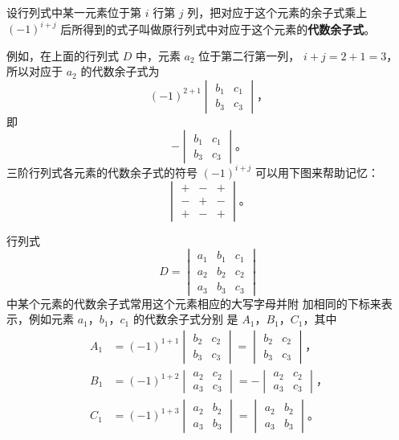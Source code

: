 设行列式中某一元素位于第 $i$ 行第 $j$ 列，把对应于这个元素的余子式乘上
 $(-1)^{i+j}$ 后所得到的式子叫做原行列式中对应于这个元素的\textbf{代数余子式}。

例如，在上面的行列式 $D$ 中，元素 $a_2$ 位于第二行第一列，
$i + j = 2 + 1 = 3$， 所以对应于 $a_2$ 的代数余子式为
$$
(-1)^{2+1}\begin{vmatrix}
    b_1 & c_1 \\
    b_3 & c_3
\end{vmatrix} \text{，}
$$
即
$$
-\begin{vmatrix}
    b_1 & c_1 \\
    b_3 & c_3
\end{vmatrix} \text{。}
$$
三阶行列式各元素的代数余子式的符号 $(-1)^{i+j}$ 可以用下图来帮助记忆：
$$
\begin{vmatrix}
	+ & - & + \\
	- & + & - \\
	+ & - & +
\end{vmatrix} \text{。}
$$

行列式
$$
D = \begin{vmatrix*}
    a_1 & b_1 & c_1 \\
    a_2 & b_2 & c_2 \\
    a_3 & b_3 & c_3
\end{vmatrix*}
$$
中某个元素的代数余子式常用这个元素相应的大写字母并附
加相同的下标来表示，例如元素 $a_1$，$b_1$，$c_1$ 的代数余子式分别
是 $A_1$，$B_1$，$C_1$，其中
\begin{align*}
    A_1 &= (-1)^{1+1}
            \begin{vmatrix}
                b_2 & c_2 \\
                b_3 & c_3
            \end{vmatrix}
        =   \begin{vmatrix}
                b_2 & c_2 \\
                b_3 & c_3
            \end{vmatrix} \text{，} \\
    B_1 &= (-1)^{1+2}
            \begin{vmatrix}
                a_2 & c_2 \\
                a_3 & c_3
            \end{vmatrix}
        = - \begin{vmatrix}
                a_2 & c_2 \\
                a_3 & c_3
            \end{vmatrix} \text{，} \\
    C_1 &= (-1)^{1+3}
            \begin{vmatrix}
                a_2 & b_2 \\
                a_3 & b_3
            \end{vmatrix}
        =   \begin{vmatrix}
                a_2 & b_2 \\
                a_3 & b_3
            \end{vmatrix} \text{。} \\
\end{align*}


